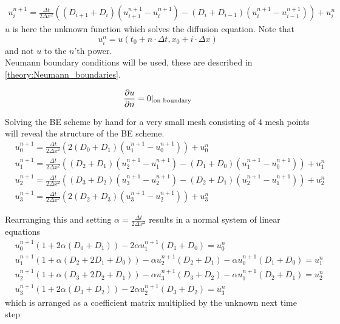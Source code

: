 \begin{align}\label{theory:BE_scheme_1D}
 u^{n+1}_i = \frac{\Delta t}{2\Delta x^2}\left((D_{i+1}+D_{i})(u^{n+1}_{i+1}-u^{n+1}_{i})-(D_{i}+D_{i-1})(u^{n+1}_{i}-u^{n+1}_{i-1})\right) + u^n_i
\end{align}
$u$ is here the unknown function which solves the diffusion equation. 
Note that 
$$u^n_i = u(t_0+n\cdot\Delta t,x_0+i\cdot\Delta x)$$
and not $u$ to the $n$'th power. \\
Neumann boundary conditions will be used, these are described in \eqref{theory:Neumann_boundaries}.

\begin{equation}\label{theory:Neumann_boundaries}
 \frac{\partial u}{\partial n} = 0|_{\text{on boundary}}
\end{equation}

\noindent Solving the BE scheme by hand for a very small mesh consisting of $4$ mesh points will reveal the structure of the BE scheme.
\begin{align*}
 &u^{n+1}_0 =  \frac{\Delta t}{2\Delta x^2}\left(2(D_{0}+D_{1})(u^{n+1}_{1}-u^{n+1}_{0})\right) + u^n_0\\
 &u^{n+1}_1 = \frac{\Delta t}{2\Delta x^2}\left((D_{2}+D_{1})(u^{n+1}_{2}-u^{n+1}_{1})-(D_{1}+D_{0})(u^{n+1}_{1}-u^{n+1}_{0})\right) + u^n_1\\
 &u^{n+1}_2 = \frac{\Delta t}{2\Delta x^2}\left((D_{3}+D_{2})(u^{n+1}_{3}-u^{n+1}_{2})-(D_{2}+D_{1})(u^{n+1}_{2}-u^{n+1}_{1})\right) + u^n_2 \\
 &u^{n+1}_3 =  \frac{\Delta t}{2\Delta x^2}\left(2(D_{2}+D_{3})(u^{n+1}_{3}-u^{n+1}_{2})\right) + u^n_3
\end{align*}

\noindent Rearranging this and setting $\alpha = \frac{\Delta t}{2\Delta x^2}$ results in a normal system of linear equations
\begin{align*}
 &u^{n+1}_0\left(1+2\alpha(D_0+D_1)\right)- 2\alpha u^{n+1}_{1}(D_1+D_0) =  u^n_0\\
 &u^{n+1}_1\left(1+\alpha(D_2+2D_1+D_0)\right)-\alpha u^{n+1}_{2}(D_2+D_1)-\alpha u^{n+1}_{0}(D_1+D_0) = u^n_1\\
 &u^{n+1}_2\left(1+\alpha(D_3+2D_2+D_1)\right)-\alpha u^{n+1}_{3}(D_3+D_2)-\alpha u^{n+1}_{1}(D_2+D_1) = u^n_2\\
 &u^{n+1}_3\left(1+2\alpha(D_3+D_2)\right)- 2\alpha u^{n+1}_{2}(D_3+D_2) =  u^n_3
\end{align*}
which is arranged as a coefficient matrix multiplied by the unknown next time step

